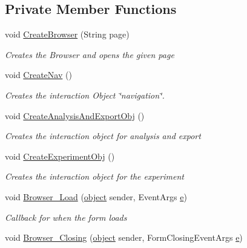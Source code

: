 \subsection*{Private Member Functions}
\begin{DoxyCompactItemize}
\item 
void \hyperlink{class_web_analyzer_1_1_u_i_1_1_h_t_m_l_u_i_afaacdee71a728c1cbe04087351e70395}{Create\+Browser} (String page)
\begin{DoxyCompactList}\small\item\em Creates the Browser and opens the given page \end{DoxyCompactList}\item 
void \hyperlink{class_web_analyzer_1_1_u_i_1_1_h_t_m_l_u_i_a274870a5d1268fa3a2e40d674cf8e61b}{Create\+Nav} ()
\begin{DoxyCompactList}\small\item\em Creates the interaction Object \char`\"{}navigation\char`\"{}. \end{DoxyCompactList}\item 
void \hyperlink{class_web_analyzer_1_1_u_i_1_1_h_t_m_l_u_i_a167ae69309a8f44387164d5f6d8f0c29}{Create\+Analysis\+And\+Export\+Obj} ()
\begin{DoxyCompactList}\small\item\em Creates the interaction object for analysis and export \end{DoxyCompactList}\item 
void \hyperlink{class_web_analyzer_1_1_u_i_1_1_h_t_m_l_u_i_af92127c0a733a77a2363ff1d8b26713b}{Create\+Experiment\+Obj} ()
\begin{DoxyCompactList}\small\item\em Creates the interaction object for the experiment \end{DoxyCompactList}\item 
void \hyperlink{class_web_analyzer_1_1_u_i_1_1_h_t_m_l_u_i_abc8c290c8b516e80333172298d96eb52}{Browser\+\_\+\+Load} (\hyperlink{_u_i_2_h_t_m_l_resources_2js_2lib_2underscore_8min_8js_aae18b7515bb2bc4137586506e7c0c903}{object} sender, Event\+Args \hyperlink{_u_i_2_h_t_m_l_resources_2js_2lib_2bootstrap_8min_8js_ab5902775854a8b8440bcd25e0fe1c120}{e})
\begin{DoxyCompactList}\small\item\em Callback for when the form loads \end{DoxyCompactList}\item 
void \hyperlink{class_web_analyzer_1_1_u_i_1_1_h_t_m_l_u_i_a18e4826c64957f86ccc5726d4b21e38b}{Browser\+\_\+\+Closing} (\hyperlink{_u_i_2_h_t_m_l_resources_2js_2lib_2underscore_8min_8js_aae18b7515bb2bc4137586506e7c0c903}{object} sender, Form\+Closing\+Event\+Args \hyperlink{_u_i_2_h_t_m_l_resources_2js_2lib_2bootstrap_8min_8js_ab5902775854a8b8440bcd25e0fe1c120}{e})

\end{DoxyCompactItemize}
